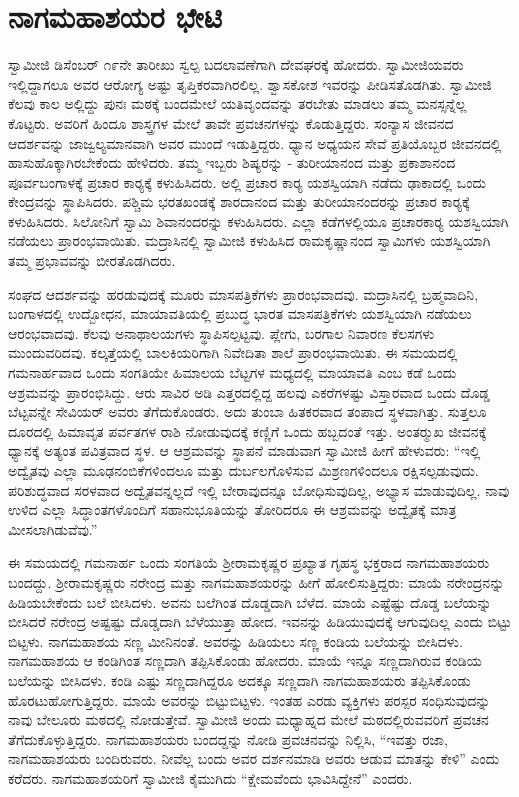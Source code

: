 
\chapter{ನಾಗಮಹಾಶಯರ ಭೇಟಿ }

\vskip 3pt

 ಸ್ವಾಮೀಜಿ ಡಿಸೆಂಬರ್ ೧೯ನೇ ತಾರೀಖು ಸ್ವಲ್ಪ ಬದಲಾವಣೆಗಾಗಿ ದೇವಘರಕ್ಕೆ ಹೋದರು. ಸ್ವಾಮೀಜಿಯವರು ಇಲ್ಲಿದ್ದಾಗಲೂ ಅವರ ಆರೋಗ್ಯ ಅಷ್ಟು ತೃಪ್ತಿಕರವಾಗಿರಲಿಲ್ಲ. ಶ್ವಾಸಕೋಶ ಇವರನ್ನು ಪೀಡಿಸತೊಡಗಿತು. ಸ್ವಾಮೀಜಿ ಕೆಲವು ಕಾಲ ಅಲ್ಲಿದ್ದು ಪುನಃ ಮಠಕ್ಕೆ ಬಂದಮೇಲೆ ಯತಿವೃಂದವನ್ನು ತರಬೇತು ಮಾಡಲು ತಮ್ಮ ಮನಸ್ಸನ್ನೆಲ್ಲ ಕೊಟ್ಟರು. ಅವರಿಗೆ ಹಿಂದೂ ಶಾಸ್ತ್ರಗಳ ಮೇಲೆ ತಾವೇ ಪ್ರವಚನಗಳನ್ನು ಕೊಡುತ್ತಿದ್ದರು. ಸಂನ್ಯಾಸ ಜೀವನದ ಆದರ್ಶವನ್ನು ಜಾಜ್ವಲ್ಯಮಾನವಾಗಿ ಅವರ ಮುಂದೆ ಇಡುತ್ತಿದ್ದರು. ಧ್ಯಾನ ಅಧ್ಯಯನ ಸೇವೆ ಪ್ರತಿಯೊಬ್ಬರ ಜೀವನದಲ್ಲಿ ಹಾಸುಹೊಕ್ಕಾಗಿರಬೇಕೆಂದು ಹೇಳಿದರು. ತಮ್ಮ ಇಬ್ಬರು ಶಿಷ್ಯರನ್ನು - ತುರೀಯಾನಂದ ಮತ್ತು ಪ್ರಕಾಶಾನಂದ ಪೂರ್ವಬಂಗಾಳಕ್ಕೆ ಪ್ರಚಾರ ಕಾರ‍್ಯಕ್ಕೆ ಕಳುಹಿಸಿದರು. ಅಲ್ಲಿ ಪ್ರಚಾರ ಕಾರ‍್ಯ ಯಶಸ್ವಿಯಾಗಿ ನಡೆದು ಢಾಕಾದಲ್ಲಿ ಒಂದು ಕೇಂದ್ರವನ್ನು ಸ್ಥಾಪಿಸಿದರು. ಪಶ್ಚಿಮ ಭರತಖಂಡಕ್ಕೆ ಶಾರದಾನಂದ ಮತ್ತು ತುರೀಯಾನಂದರನ್ನು ಪ್ರಚಾರ ಕಾರ‍್ಯಕ್ಕೆ ಕಳುಹಿಸಿದರು. ಸಿಲೋನಿಗೆ ಸ್ವಾಮಿ ಶಿವಾನಂದರನ್ನು ಕಳುಹಿಸಿದರು. ಎಲ್ಲಾ ಕಡೆಗಳಲ್ಲಿಯೂ ಪ್ರಚಾರಕಾರ‍್ಯ ಯಶಸ್ವಿಯಾಗಿ ನಡೆಯಲು ಪ್ರಾರಂಭವಾಯಿತು. ಮದ್ರಾಸಿನಲ್ಲಿ ಸ್ವಾಮೀಜಿ ಕಳುಹಿಸಿದ ರಾಮಕೃಷ್ಣಾನಂದ ಸ್ವಾಮಿಗಳು ಯಶಸ್ವಿಯಾಗಿ ತಮ್ಮ ಪ್ರಭಾವವನ್ನು ಬೀರತೊಡಗಿದರು. 

\vskip 3pt

 ಸಂಘದ ಆದರ್ಶವನ್ನು ಹರಡುವುದಕ್ಕೆ ಮೂರು ಮಾಸಪತ್ರಿಕೆಗಳು ಪ್ರಾರಂಭವಾದವು. ಮದ್ರಾಸಿನಲ್ಲಿ ಬ್ರಹ್ಮವಾದಿನಿ, ಬಂಗಾಳದಲ್ಲಿ ಉದ್ಬೋಧನ, ಮಾಯಾವತಿಯಲ್ಲಿ ಪ್ರಬುದ್ಧ ಭಾರತ ಮಾಸಪತ್ರಿಕೆಗಳು ಯಶಸ್ವಿಯಾಗಿ ನಡೆಯಲು ಆರಂಭವಾದವು. ಕೆಲವು ಅನಾಥಾಲಯಗಳು ಸ್ಥಾಪಿಸಲ್ಪಟ್ಟವು. ಪ್ಲೇಗು, ಬರಗಾಲ ನಿವಾರಣ ಕೆಲಸಗಳು ಮುಂದುವರಿದವು. ಕಲ್ಕತ್ತೆಯಲ್ಲಿ ಬಾಲಕಿಯರಿಗಾಗಿ ನಿವೇದಿತಾ ಶಾಲೆ ಪ್ರಾರಂಭವಾಯಿತು. ಈ ಸಮಯದಲ್ಲಿ ಗಮನಾರ್ಹವಾದ ಒಂದು ಸಂಗತಿಯೇ ಹಿಮಾಲಯ ಬೆಟ್ಟಗಳ ಮಧ್ಯದಲ್ಲಿ ಮಾಯಾವತಿ ಎಂಬ ಕಡೆ ಒಂದು ಆಶ್ರಮವನ್ನು ಪ್ರಾರಂಭಿಸಿದ್ದು. ಆರು ಸಾವಿರ ಅಡಿ ಎತ್ತರದಲ್ಲಿದ್ದ ಹಲವು ಎಕರೆಗಳಷ್ಟು ವಿಸ್ತಾರವಾದ ಒಂದು ದೊಡ್ಡ ಬೆಟ್ಟವನ್ನೇ ಸೇವಿಯರ್ ಅವರು ತೆಗೆದುಕೊಂಡರು. ಅದು ತುಂಬಾ ಹಿತಕರವಾದ ತಂಪಾದ ಸ್ಥಳವಾಗಿತ್ತು. ಸುತ್ತಲೂ ದೂರದಲ್ಲಿ ಹಿಮಾವೃತ ಪರ್ವತಗಳ ರಾಶಿ ನೋಡುವುದಕ್ಕೆ ಕಣ್ಣಿಗೆ ಒಂದು ಹಬ್ಬದಂತೆ ಇತ್ತು. ಅಂತರ‍್ಮುಖ ಜೀವನಕ್ಕೆ ಧ್ಯಾನಕ್ಕೆ ಅತ್ಯಂತ ಪವಿತ್ರವಾದ ಸ್ಥಳ. ಆ ಆಶ್ರಮವನ್ನು ಸ್ಥಾಪನೆ ಮಾಡುವಾಗ ಸ್ವಾಮೀಜಿ ಹೀಗೆ ಹೇಳುವರು: “ಇಲ್ಲಿ ಅದ್ವೈತವು ಎಲ್ಲಾ ಮೂಢನಂಬಿಕೆಗಳಿಂದಲೂ ಮತ್ತು ದುರ್ಬಲಗೊಳಿಸುವ ಮಿಶ್ರಣಗಳಿಂದಲೂ ರಕ್ಷಿಸಲ್ಪಡುವುದು. ಪರಿಶುದ್ಧವಾದ ಸರಳವಾದ ಅದ್ವೈತವನ್ನಲ್ಲದೆ ಇಲ್ಲಿ ಬೇರಾವುದನ್ನೂ ಬೋಧಿಸುವುದಿಲ್ಲ, ಅಭ್ಯಾಸ ಮಾಡುವುದಿಲ್ಲ. ನಾವು ಉಳಿದ ಎಲ್ಲಾ ಸಿದ್ಧಾಂತಗಳೊಂದಿಗೆ ಸಹಾನುಭೂತಿಯನ್ನು ತೋರಿದರೂ ಈ ಆಶ್ರಮವನ್ನು ಅದ್ವೈತಕ್ಕೆ ಮಾತ್ರ ಮೀಸಲಾಗಿಡುವೆವು.” 

 ಈ ಸಮಯದಲ್ಲಿ ಗಮನಾರ್ಹ ಒಂದು ಸಂಗತಿಯೆ ಶ‍್ರೀರಾಮಕೃಷ್ಣರ ಪ್ರಖ್ಯಾತ ಗೃಹಸ್ಥ ಭಕ್ತರಾದ ನಾಗಮಹಾಶಯರು ಬಂದದ್ದು. ಶ‍್ರೀರಾಮಕೃಷ್ಣರು ನರೇಂದ್ರ ಮತ್ತು ನಾಗಮಹಾಶಯರನ್ನು ಹೀಗೆ ಹೋಲಿಸುತ್ತಿದ್ದರು: ಮಾಯೆ ನರೇಂದ್ರನನ್ನು ಹಿಡಿಯಬೇಕೆಂದು ಬಲೆ ಬೀಸಿದಳು. ಅವನು ಬಲೆಗಿಂತ ದೊಡ್ಡದಾಗಿ ಬೆಳೆದ. ಮಾಯೆ ಎಷ್ಟೆಷ್ಟು ದೊಡ್ಡ ಬಲೆಯನ್ನು ಬೀಸಿದರೆ ನರೇಂದ್ರ ಅಷ್ಟಷ್ಟು ದೊಡ್ಡದಾಗಿ ಬೆಳೆಯುತ್ತಾ ಹೋದ. ಇವನನ್ನು ಹಿಡಿಯುವುದಕ್ಕೆ ಆಗುವುದಿಲ್ಲ ಎಂದು ಬಿಟ್ಟು ಬಿಟ್ಟಳು. ನಾಗಮಹಾಶಯ ಸಣ್ಣ ಮೀನಿನಂತೆ. ಅವರನ್ನು ಹಿಡಿಯಲು ಸಣ್ಣ ಕಂಡಿಯ ಬಲೆಯನ್ನು ಬೀಸಿದಳು. ನಾಗಮಹಾಶಯ ಆ ಕಂಡಿಗಿಂತ ಸಣ್ಣದಾಗಿ ತಪ್ಪಿಸಿಕೊಂಡು ಹೋದರು. ಮಾಯೆ ಇನ್ನೂ ಸಣ್ಣದಾಗಿರುವ ಕಂಡಿಯ ಬಲೆಯನ್ನು ಬೀಸಿದಳು. ಕಂಡಿ ಎಷ್ಟು ಸಣ್ಣದಾಗಿದ್ದರೂ ಅದಕ್ಕೂ ಸಣ್ಣದಾಗಿ ನಾಗಮಹಾಶಯರು ತಪ್ಪಿಸಿಕೊಂಡು ಹೊರಟುಹೋಗುತ್ತಿದ್ದರು. ಮಾಯೆ ಅವರನ್ನು ಬಿಟ್ಟುಬಿಟ್ಟಳು. ಇಂತಹ ಎರಡು ವ್ಯಕ್ತಿಗಳು ಪರಸ್ಪರ ಸಂಧಿಸುವುದನ್ನು ನಾವು ಬೇಲೂರು ಮಠದಲ್ಲಿ ನೋಡುತ್ತೇವೆ. ಸ್ವಾಮೀಜಿ ಅಂದು ಮಧ್ಯಾಹ್ನದ ಮೇಲೆ ಮಠದಲ್ಲಿರುವವರಿಗೆ ಪ್ರವಚನ ತೆಗೆದುಕೊಳ್ಳುತ್ತಿದ್ದರು. ನಾಗಮಹಾಶಯರು ಬಂದದ್ದನ್ನು ನೋಡಿ ಪ್ರವಚನವನ್ನು ನಿಲ್ಲಿಸಿ, “ಇವತ್ತು ರಜಾ, ನಾಗಮಹಾಶಯರು ಬಂದಿರುವರು. ನೀವೆಲ್ಲ ಬಂದು ಅವರ ದರ್ಶನಮಾಡಿ ಅವರು ಆಡುವ ಮಾತನ್ನು ಕೇಳಿ” ಎಂದು ಕರೆದರು. ನಾಗಮಹಾಶಯರಿಗೆ ಸ್ವಾಮೀಜಿ ಕೈಮುಗಿದು “ಕ್ಷೇಮವೆಂದು ಭಾವಿಸಿದ್ದೇನೆ” ಎಂದರು. 

